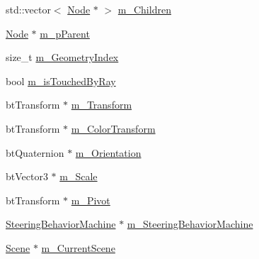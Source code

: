 \begin{DoxyCompactItemize}
\item 
std\+::vector$<$ \mbox{\hyperlink{classnjli_1_1_node}{Node}} $\ast$ $>$ \mbox{\hyperlink{classnjli_1_1_node_a0cc4f40e2cdc109e1dddb57a2282f4c7}{m\+\_\+\+Children}}
\item 
\mbox{\hyperlink{classnjli_1_1_node}{Node}} $\ast$ \mbox{\hyperlink{classnjli_1_1_node_ab91a76d7fdcb69284175eaf51ae5694b}{m\+\_\+p\+Parent}}
\item 
size\+\_\+t \mbox{\hyperlink{classnjli_1_1_node_ae1aaf55ff1ea611b3d4d1adf0fcbf1e2}{m\+\_\+\+Geometry\+Index}}
\item 
bool \mbox{\hyperlink{classnjli_1_1_node_ac89e94627bb4bb5e418f15f36f936245}{m\+\_\+is\+Touched\+By\+Ray}}
\item 
bt\+Transform $\ast$ \mbox{\hyperlink{classnjli_1_1_node_a8ec7076cfda5578b99c9f582a0beb4eb}{m\+\_\+\+Transform}}
\item 
bt\+Transform $\ast$ \mbox{\hyperlink{classnjli_1_1_node_a55837964c343cdfac328f9c8c779dbb5}{m\+\_\+\+Color\+Transform}}
\item 
bt\+Quaternion $\ast$ \mbox{\hyperlink{classnjli_1_1_node_a443a5fd1ec25ed12ac6bd0c219a70201}{m\+\_\+\+Orientation}}
\item 
bt\+Vector3 $\ast$ \mbox{\hyperlink{classnjli_1_1_node_ab0b2ca986d3881d4ccd5404097b6c0c9}{m\+\_\+\+Scale}}
\item 
bt\+Transform $\ast$ \mbox{\hyperlink{classnjli_1_1_node_aa2f2d5836c6cf6c99937e50bf2603c21}{m\+\_\+\+Pivot}}
\item 
\mbox{\hyperlink{classnjli_1_1_steering_behavior_machine}{Steering\+Behavior\+Machine}} $\ast$ \mbox{\hyperlink{classnjli_1_1_node_a6b21e06dc194ce9478cb7d48652b6f7f}{m\+\_\+\+Steering\+Behavior\+Machine}}
\item 
\mbox{\hyperlink{classnjli_1_1_scene}{Scene}} $\ast$ \mbox{\hyperlink{classnjli_1_1_node_a7e8e57ab902ac7349b1bbcc4abaf4d21}{m\+\_\+\+Current\+Scene}}
\end{DoxyCompactItemize}
